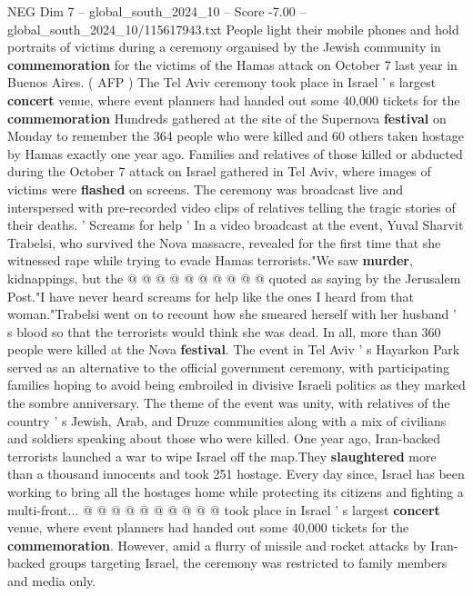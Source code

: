 \begin{textsample}{NEG Dim 7 – global\_south\_2024\_10 – Score -7.00 – global\_south\_2024\_10/115617943.txt}  \label{ex:f7_neg_249}
People light their mobile phones and hold portraits of victims during a ceremony organised by the Jewish community in \textbf{commemoration} for the victims of the Hamas attack on October 7 last year in Buenos Aires. ( AFP ) The Tel Aviv ceremony took place in Israel ' s largest \textbf{concert} venue, where event planners had handed out some 40,000 tickets for the \textbf{commemoration} Hundreds gathered at the site of the Supernova \textbf{festival} on Monday to remember the 364 people who were killed and 60 others taken hostage by Hamas exactly one year ago.
Families and relatives of those killed or abducted during the October 7 attack on Israel gathered in Tel Aviv, where images of victims were \textbf{flashed} on screens.
The ceremony was broadcast live and interspersed with pre-recorded video clips of relatives telling the tragic stories of their deaths. ' Screams for help ' In a video broadcast at the event, Yuval Sharvit Trabelsi, who survived the Nova massacre, revealed for the first time that she witnessed rape while trying to evade Hamas terrorists."We saw \textbf{murder}, kidnappings, but the @ @ @ @ @ @ @ @ @ @ quoted as saying by the Jerusalem Post."I have never heard screams for help like the ones I heard from that woman."Trabelsi went on to recount how she smeared herself with her husband ' s blood so that the terrorists would think she was dead.
In all, more than 360 people were killed at the Nova \textbf{festival}.
The event in Tel Aviv ' s Hayarkon Park served as an alternative to the official government ceremony, with participating families hoping to avoid being embroiled in divisive Israeli politics as they marked the sombre anniversary.
The theme of the event was unity, with relatives of the country ' s Jewish, Arab, and Druze communities along with a mix of civilians and soldiers speaking about those who were killed.
One year ago, Iran-backed terrorists launched a war to wipe Israel off the map.They \textbf{slaughtered} more than a thousand innocents and took 251 hostage.
Every day since, Israel has been working to bring all the hostages home while protecting its citizens and fighting a multi-front... @ @ @ @ @ @ @ @ @ @ took place in Israel ' s largest \textbf{concert} venue, where event planners had handed out some 40,000 tickets for the \textbf{commemoration}.
However, amid a flurry of missile and rocket attacks by Iran-backed groups targeting Israel, the ceremony was restricted to family members and media only.

\end{textsample}
